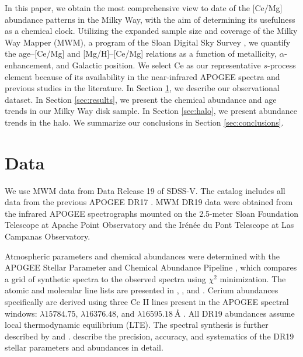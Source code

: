 \documentclass[twocolumn,twocolappendix]{aastex701}
\begin{document}
In this paper, we obtain the most comprehensive view to date of the [Ce/Mg] abundance patterns in the Milky Way, with the aim of determining its usefulness as a chemical clock. Utilizing the expanded sample size and coverage of the Milky Way Mapper (MWM), a program of the Sloan Digital Sky Survey \citep[SDSS-V;][]{kollmeier_sdss-v_2017,kollmeier_sloan_2026}, we quantify the age--[Ce/Mg] and [Mg/H]--[Ce/Mg] relations as a function of metallicity, $\alpha$-enhancement, and Galactic position. We select Ce as our representative $s$-process element because of its availability in the near-infrared APOGEE spectra and previous studies in the literature. In Section \ref{sec:data}, we describe our observational dataset. In Section \ref{sec:results}, we present the chemical abundance and age trends in our Milky Way disk sample. In Section \ref{sec:halo}, we present abundance trends in the halo. We summarize our conclusions in Section \ref{sec:conclusions}.

\section{Data}
\label{sec:data}

We use MWM data from Data Release 19 \citep[DR19;][]{sdss_collaboration_nineteenth_2025} of SDSS-V.
The catalog includes all data from the previous APOGEE DR17 \citep{abdurrouf_seventeenth_2022}. MWM DR19 data were obtained from the infrared APOGEE spectrographs \citep{wilson_apache_2019} mounted on the 2.5-meter Sloan Foundation Telescope \citep{gunn_25_2006} at Apache Point Observatory and the Ir{\'e}n{\'e}e du Pont Telescope \citep{bowen_optical_1973} at Las Campanas Observatory. 

Atmospheric parameters and chemical abundances were determined with the APOGEE Stellar Parameter and Chemical Abundance Pipeline \citep[ASPCAP;][]{garcia_perez_aspcap_2016}, which compares a grid of synthetic spectra \citep{hubeny_tlusty_2021} to the observed spectra using $\chi^2$ minimization. The atomic and molecular line lists are presented in \citet{hasselquist_identification_2016}, \citet{cunha_adding_2017}, and \citet{smith_apogee_2021}. 
Cerium abundances specifically are derived using three Ce II lines present in the APOGEE spectral windows: $\lambda\num{15784.75}$, $\lambda\num{16376.48}$, and $\lambda\SI{16595.18}{\angstrom}$ \citep{cunha_adding_2017}. All DR19 abundances assume local thermodynamic equilibrium (LTE). The spectral synthesis is further described by \citet{holtzman_apogee_2018} and \citet{jonsson_apogee_2020}. \citet{meszaros_sdss-v_2025} describe the precision, accuracy, and systematics of the DR19 stellar parameters and abundances in detail.
\end{document}
